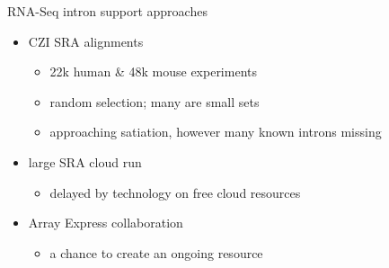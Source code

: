 \documentclass[10pt,
               hyperref={bookmarks=false,
                         bookmarksopen=false,
                         colorlinks=true,
                         linkcolor=blue,
                         urlcolor=blue},
               xcolor={svgnames,table}]{beamer}
\newenvironment{tightitemize}{%
\begin{itemize}
  \setlength{\itemsep}{1pt}%
  \setlength{\parskip}{0pt}%
  \setlength{\parsep}{0pt}%
}{\end{itemize}}
\begin{document}
\begin{frame}{RNA-Seq intron support approaches}
  \begin{itemize}
  \item CZI SRA alignments
    \begin{tightitemize}
    \item 22k human \& 48k mouse experiments
    \item random selection; many are small sets
    \item approaching satiation, however many known introns missing
    \end{tightitemize}
  \item large SRA cloud run
    \begin{tightitemize}
    \item delayed by technology on free cloud resources
    \end{tightitemize}
  \item Array Express collaboration
    \begin{tightitemize}
    \item a chance to create an ongoing resource
    \end{tightitemize}
  \end{itemize}
\end{frame}
\end{document}
